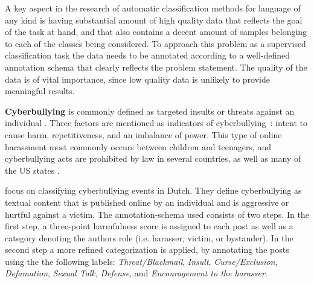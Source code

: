 \documentclass{article}
\begin{document}
A key aspect in the research of automatic classification methods for language of any kind is having substantial amount of high quality data that reflects the goal of the task at hand, and that also contains a decent amount of samples belonging to each of the classes being considered. 
To approach this problem as a supervised classification task the data needs to be annotated according to a well-defined annotation schema that clearly reflects the problem statement. The quality of the data is of vital importance, since low quality data is unlikely to provide meaningful results. 

\textbf{Cyberbullying} is  commonly defined as targeted insults or threats against an individual \cite{zampieri2019predicting}. Three factors are mentioned as indicators of cyberbullying~\cite{guidelinesCyberbullying}: intent to cause harm, repetitiveness, and an imbalance of power. This type of online harassment most commonly occurs between children and teenagers, and cyberbullying acts are prohibited by law in several countries, as well as many of the US states \cite{gregorie2001cyberstalking}.

\cite{van2015detection} focus on classifying cyberbullying events in Dutch. They define cyberbullying as textual content that is published online by an individual and is aggressive or hurtful against a victim. The annotation-schema used consists of two steps. In the first step, a three-point harmfulness score is assigned to each post as well as a category denoting the authors role (i.e. harasser, victim, or bystander). In the second step a more refined categorization is applied, by annotating the posts using the the following labels:
\textit{Threat/Blackmail}, \textit{Insult}, \textit{Curse/Exclusion}, \textit{Defamation}, \textit{Sexual Talk}, \textit{Defense}, and \textit{Encouragement to the harasser}. 
\end{document}
